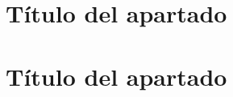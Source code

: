 \label{chp:Utiliz}

\section{Título del apartado}
\label{sec:TestSuiteCrec}

\section{Título del apartado}



\chapterend{}
